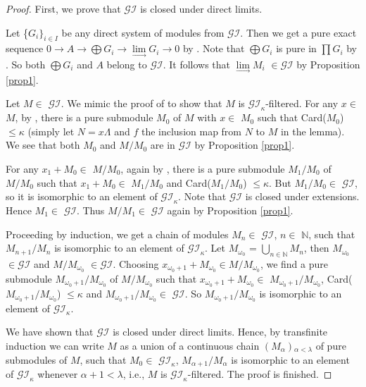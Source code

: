 \documentclass[11pt,a4paper]{article}
\begin{document}
\begin{proof} First, we prove that $\mathscr{GI}$ is closed under  direct limits.

 Let \{$G_{i}\}_{i\in I}$ be any direct system of   modules from  $\mathscr{GI}$. Then we get a pure exact sequence
$0\rightarrow A\rightarrow \bigoplus G_{i} \rightarrow \lim\limits_{ \longrightarrow }G_{i} \rightarrow 0$   by  \cite[Corollary 2.9]{gbe}.  Note that $\bigoplus G_{i} $ is pure in $\prod G_{i} $ by \cite[Corollary 2.21(c)]{gbe}. So both $\bigoplus G_{i} $ and  $A$ belong to $ \mathscr{GI}$.   It follows that  $\lim\limits_{ \longrightarrow }M_{i}$ $\in \mathscr{GI}$ by Proposition   \ref{prop1}.

Let $M \in$ $\mathscr{GI}$. We mimic  the proof     of \cite[Corollary 3.3.4]{eno6} to show that $M$  is $\mathscr{GI}_{\kappa}$-filtered. For any $x\in$ $M$, by  \cite[Lemma
5.3.12]{eno5}, there is a pure submodule  $M_{0}$ of $M$ with $x\in$ $M_{0}$ such that
Card($M_{0}$) $\leq \kappa$	 (simply let  $N = x\Lambda$ and $f $ the   inclusion map from $N $ to $M $ in the lemma). We see that both  $M_{0}$ and  $M/M_{0}$
are in $\mathscr{GI}$ by Proposition \ref{prop1}.

For any  $x_{1} + M_{0} \in$ $M/M_{0}$, again by  \cite[Lemma
5.3.12]{eno5}, there is a pure submodule  $M_{1}/M_{0}$ of $M/M_{0}$ such that $x_{1} +  M_{0}  \in$ $M_{1}/M_{0}$ and
Card($M_{1}/M_{0}$) $\leq \kappa$.  But  $M_{1}/M_{0} \in$ $\mathscr{GI}$,  so it is isomorphic to an element of $\mathscr{GI}_{\kappa}$.
Note that  $\mathscr{GI}$   is closed under extensions. Hence $M_{1} \in$ $\mathscr{GI}$.
  Thus   $M/M_{1} \in$ $\mathscr{GI}$ again by Proposition \ref{prop1}.

  Proceeding by induction, we get a chain of  modules $M_{n} \in$ $\mathscr{GI}$,  $n \in$ $\mathbb{N}$, such that $M_{n+1}/M_{n}  $ is isomorphic to an element of $\mathscr{GI}_{\kappa}$.
Let $M_{\omega_{0}}$ = $\bigcup_{n\in \mathbb{N}}M_{n}$, then $M_{\omega_{0}}$ $\in \mathscr{GI}$ and  $M/M_{\omega_{0}}$ $\in \mathscr{GI}$.
Choosing $x_{\omega_{0}+1} + M_{\omega_{0}} \in M/M_{\omega_{0}}$, we find  a pure submodule  $M_{\omega_{0}+1}/M_{\omega_{0}}$ of $M/M_{\omega_{0}}$ such that
 $x_{\omega_{0}+1} + M_{\omega_{0}}  \in$ $M_{\omega_{0}+1}/M_{\omega_{0}}$,
Card($M_{\omega_{0}+1}/M_{\omega_{0}}$) $\leq \kappa$ and  $M_{\omega_{0}+1}/M_{\omega_{0}} \in$ $\mathscr{GI}$.  So $M_{\omega_{0}+1}/M_{\omega_{0}}$  is isomorphic to an element of $\mathscr{GI}_{\kappa}$.

We have shown that  $\mathscr{GI}$  is closed under direct limits. Hence, by transfinite induction  we can write
$M$ as a union of a continuous chain $(M_{\alpha})$$_{\alpha < \lambda}$ of  pure submodules of $M$, such that
 $M_{0}\in$  $\mathscr{GI}_{\kappa}$, $M_{\alpha + 1}/M_{\alpha}  $  is isomorphic to an element of $\mathscr{GI}_{\kappa}$  whenever $\alpha + 1 < \lambda$,
i.e., $M$  is $\mathscr{GI}_{\kappa}$-filtered. The
proof is finished.\end{proof}
\end{document}

